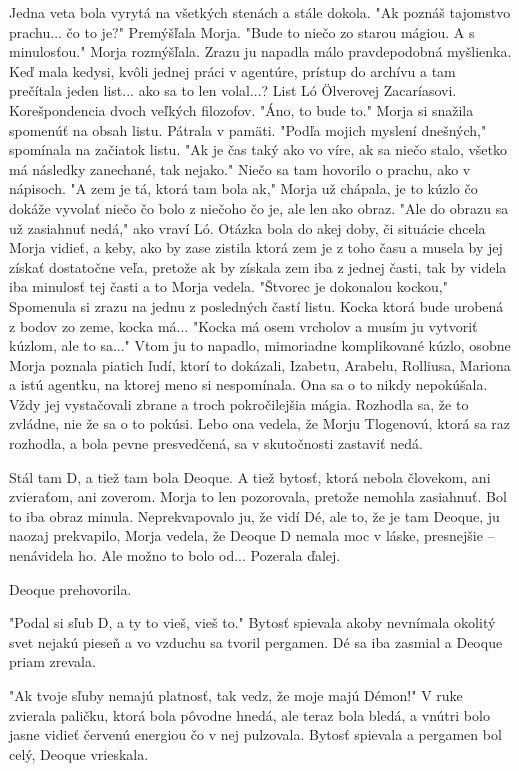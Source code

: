 \documentclass{book}
\begin{document}
Jedna veta bola vyrytá na všetkých stenách a stále dokola. "$ $Ak poznáš tajomstvo prachu... čo to je?"$ $ Premýšľala Morja. "$ $Bude to niečo zo starou mágiou. A s minulosťou."$ $ Morja rozmýšľala. Zrazu ju napadla málo pravdepodobná myšlienka. Keď mala kedysi, kvôli jednej práci v agentúre, prístup do archívu a tam prečítala jeden list... ako sa to len volal...? List Ló Ölverovej Zacaríasovi. Korešpondencia dvoch veľkých filozofov. "$ $Áno, to bude to."$ $ Morja si snažila spomenúť na obsah listu. Pátrala v pamäti. "$ $Podľa mojich myslení dnešných,"$ $ spomínala na začiatok listu. "$ $Ak je čas taký ako vo víre, ak sa niečo stalo, všetko má následky zanechané, tak nejako."$ $ Niečo sa tam hovorilo o prachu, ako v nápisoch. "$ $A zem je tá, ktorá tam bola ak,"$ $ Morja už chápala, je to kúzlo čo dokáže vyvolať niečo čo bolo z niečoho čo je, ale len ako obraz. "$ $Ale do obrazu sa už zasiahnuť nedá,"$ $ ako vraví Ló. Otázka bola do akej doby, či situácie chcela Morja vidieť, a keby, ako by zase zistila ktorá zem je z toho času a musela by jej získať dostatočne veľa, pretože ak by získala zem iba z jednej časti, tak by videla iba minulosť tej časti a to Morja vedela. "$ $Štvorec je dokonalou kockou,"$ $ Spomenula si zrazu na jednu z posledných častí listu. Kocka ktorá bude urobená z bodov zo zeme, kocka má... "$ $Kocka má osem vrcholov a musím ju vytvoriť kúzlom, ale to sa..."$ $ Vtom ju to napadlo, mimoriadne komplikované kúzlo, osobne Morja poznala piatich ľudí, ktorí to dokázali, Izabetu, Arabelu, Rolliusa, Mariona a istú agentku, na ktorej meno si nespomínala. Ona sa o to nikdy nepokúšala. Vždy jej vystačovali zbrane a troch pokročilejšia mágia. Rozhodla sa, že to zvládne, nie že sa o to pokúsi. Lebo ona vedela, že Morju Tlogenovú, ktorá sa raz rozhodla, a bola pevne presvedčená, sa v skutočnosti zastaviť nedá.

Stál tam D, a tiež tam bola Deoque. A tiež bytosť, ktorá nebola človekom, ani zvieraťom, ani zoverom. Morja to len pozorovala, pretože nemohla zasiahnuť. Bol to iba obraz minula. Neprekvapovalo ju, že vidí Dé, ale to, že je tam Deoque, ju naozaj prekvapilo, Morja vedela, že Deoque D nemala moc v láske, presnejšie – nenávidela ho. Ale možno to bolo od... Pozerala ďalej.

Deoque prehovorila.

"$ $Podal si sľub D, a ty to vieš, vieš to."$ $ Bytosť spievala akoby nevnímala okolitý svet nejakú pieseň a vo vzduchu sa tvoril pergamen. Dé sa iba zasmial a Deoque priam zrevala.

"$ $Ak tvoje sľuby nemajú platnosť, tak vedz, že moje majú Démon!"$ $ V ruke zvierala paličku, ktorá bola pôvodne hnedá, ale teraz bola bledá, a vnútri bolo jasne vidieť červenú energiou čo v nej pulzovala. Bytosť spievala a pergamen bol celý, Deoque vrieskala.
\end{document}
